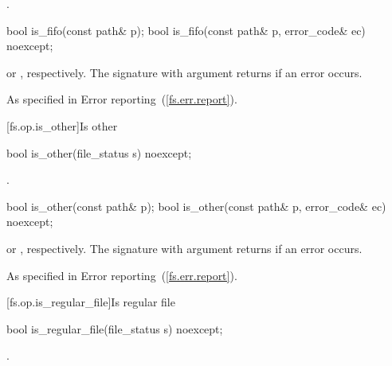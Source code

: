 \begin{itemdescr}
\pnum
\returns {}.
\end{itemdescr}


\begin{itemdecl}
bool is_fifo(const path& p);
bool is_fifo(const path& p, error_code& ec) noexcept;
\end{itemdecl}

\begin{itemdescr}
\pnum
\returns {} or , respectively.
The signature with argument  returns  if an error occurs.

\pnum
\throws As specified in Error reporting~(\ref{fs.err.report}).
\end{itemdescr}


[fs.op.is_other]{Is other}

\begin{itemdecl}
bool is_other(file_status s) noexcept;
\end{itemdecl}

\begin{itemdescr}
\pnum
\returns {}.
\end{itemdescr}

\begin{itemdecl}
bool is_other(const path& p);
bool is_other(const path& p, error_code& ec) noexcept;
\end{itemdecl}

\begin{itemdescr}
\pnum
\returns {} or ,
  respectively. The signature with argument  returns 
  if an error occurs.

\pnum
\throws As specified in Error reporting~(\ref{fs.err.report}).
\end{itemdescr}


[fs.op.is_regular_file]{Is regular file}

\begin{itemdecl}
bool is_regular_file(file_status s) noexcept;
\end{itemdecl}

\begin{itemdescr}
\pnum
\returns {}.
\end{itemdescr}


